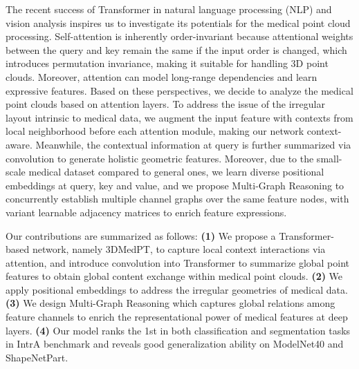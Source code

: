 \documentclass[10pt,twocolumn,letterpaper]{article}
\begin{document}
The recent success of Transformer in natural language processing (NLP) \cite{bert,xlnmet,vaswani2017attention} and vision analysis \cite{img16,kolesnikov2019big,detr,Vit} inspires us to investigate its potentials for the medical point cloud processing.
Self-attention is inherently order-invariant because attentional weights between the query and key remain the same if the input order is changed, which introduces permutation invariance, making it suitable for handling 3D point clouds.
Moreover, attention can model long-range dependencies and learn expressive features.
Based on these perspectives, we decide to analyze the medical point clouds based on attention layers.
To address the issue of the irregular layout intrinsic to medical data, we augment the input feature with contexts from local neighborhood before each attention module, making our network context-aware.
Meanwhile, the contextual information at query is further summarized via convolution to generate holistic geometric features.
Moreover, due to the small-scale medical dataset compared to general ones, we learn diverse positional embeddings at query, key and value, and we propose Multi-Graph Reasoning to concurrently establish multiple channel graphs over the same feature nodes, with variant learnable adjacency matrices to enrich feature expressions.



Our contributions are summarized as follows:
\textbf{(1)} We propose a Transformer-based network, namely 3DMedPT, to capture local context interactions via attention, and introduce convolution into Transformer to summarize global point features to obtain global content exchange within medical point clouds.
\textbf{(2)} We apply positional embeddings to address the irregular geometries of medical data.
\textbf{(3)} We design Multi-Graph Reasoning which captures global relations among feature channels to enrich the representational power of medical features at deep layers.
\textbf{(4)} Our model ranks the 1st in both classification and segmentation tasks in IntrA benchmark and reveals good generalization ability on ModelNet40 and ShapeNetPart.
\end{document}
